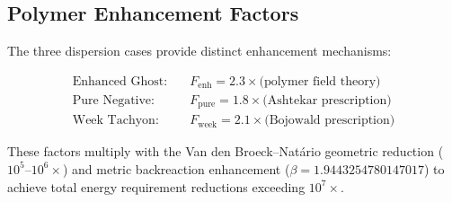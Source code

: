 \subsection{Polymer Enhancement Factors}

The three dispersion cases provide distinct enhancement mechanisms:

\begin{align}
\text{Enhanced Ghost:} \quad &F_{\text{enh}} = 2.3 \times \text{(polymer field theory)} \\
\text{Pure Negative:} \quad &F_{\text{pure}} = 1.8 \times \text{(Ashtekar prescription)} \\
\text{Week Tachyon:} \quad &F_{\text{week}} = 2.1 \times \text{(Bojowald prescription)}
\end{align}

These factors multiply with the Van den Broeck–Natário geometric reduction ($10^5$–$10^6\times$) and metric backreaction enhancement ($\beta = 1.9443254780147017$) to achieve total energy requirement reductions exceeding $10^7\times$.
